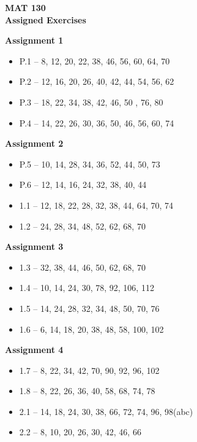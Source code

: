 \documentclass[12pt]{letter}
\author{Jacob Ayers}
\newcommand{\?}{\stackrel{?}{=}}
\begin{document}
	
	\begin{center}
		\textbf{MAT 130 \\ Assigned Exercises}
	\end{center}
	
	\textbf{Assignment 1} \begin{itemize} \vspace{-12pt}
		\item P.1 -- 8, 12, 20, 22, 38, 46, 56, 60, 64, 70
		\item P.2 -- 12, 16, 20, 26, 40, 42, 44, 54, 56, 62
		\item P.3 -- 18, 22, 34, 38, 42, 46, 50 , 76, 80
		\item P.4 -- 14, 22, 26, 30, 36, 50, 46, 56, 60, 74
	\end{itemize}

	\textbf{Assignment 2} \begin{itemize} \vspace{-12pt}
		\item P.5 -- 10, 14, 28, 34, 36, 52, 44, 50, 73
		\item P.6 -- 12, 14, 16, 24, 32, 38, 40, 44
		\item 1.1 -- 12, 18, 22, 28, 32, 38, 44, 64, 70, 74
		\item 1.2 -- 24, 28, 34, 48, 52, 62, 68, 70
	\end{itemize}

	\textbf{Assignment 3} \begin{itemize} \vspace{-12pt}
		\item 1.3 -- 32, 38, 44, 46, 50, 62, 68, 70
		\item 1.4 -- 10, 14, 24, 30, 78, 92, 106, 112
		\item 1.5 -- 14, 24, 28, 32, 34, 48, 50, 70, 76
		\item 1.6 -- 6, 14, 18, 20, 38, 48, 58, 100, 102
	\end{itemize}

	\textbf{Assignment 4} \begin{itemize} \vspace{-12pt}
		\item 1.7 -- 8, 22, 34, 42, 70, 90, 92, 96, 102
		\item 1.8 -- 8, 22, 26, 36, 40, 58, 68, 74, 78
		\item 2.1 -- 14, 18, 24, 30, 38, 66, 72, 74, 96, 98(abc)
		\item 2.2 -- 8, 10, 20, 26, 30, 42, 46, 66
	\end{itemize}
\end{document}

